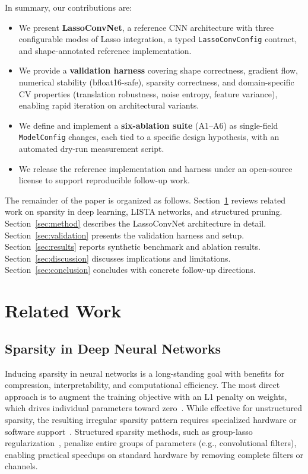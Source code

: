 \documentclass{article}
\begin{document}
In summary, our contributions are:
\begin{itemize}
    \item We present \textbf{LassoConvNet}, a reference CNN architecture with
          three configurable modes of Lasso integration, a typed
          \texttt{LassoConvConfig} contract, and shape-annotated reference
          implementation.
    \item We provide a \textbf{validation harness} covering shape correctness,
          gradient flow, numerical stability (bfloat16-safe), sparsity
          correctness, and domain-specific CV properties (translation robustness,
          noise entropy, feature variance), enabling rapid iteration on
          architectural variants.
    \item We define and implement a \textbf{six-ablation suite} (A1--A6) as
          single-field \texttt{ModelConfig} changes, each tied to a specific
          design hypothesis, with an automated dry-run measurement script.
    \item We release the reference implementation and harness under an open-source
          license to support reproducible follow-up work.
\end{itemize}

The remainder of the paper is organized as follows. Section~\ref{sec:related}
reviews related work on sparsity in deep learning, LISTA networks, and
structured pruning. Section~\ref{sec:method} describes the LassoConvNet
architecture in detail. Section~\ref{sec:validation} presents the validation
harness and setup. Section~\ref{sec:results} reports synthetic benchmark and
ablation results. Section~\ref{sec:discussion} discusses implications and
limitations. Section~\ref{sec:conclusion} concludes with concrete follow-up
directions.

\section{Related Work}
\label{sec:related}

\subsection{Sparsity in Deep Neural Networks}

Inducing sparsity in neural networks is a long-standing goal with benefits for
compression, interpretability, and computational efficiency. The most direct
approach is to augment the training objective with an L1 penalty on weights,
which drives individual parameters toward zero~\cite{han2015learning,
louizos2018learning}. While effective for unstructured sparsity, the resulting
irregular sparsity pattern requires specialized hardware or software
support~\cite{gale2019state}. Structured sparsity methods, such as group-lasso
regularization~\cite{yuan2006model, wen2016learning}, penalize entire groups of
parameters (e.g., convolutional filters), enabling practical speedups on standard
hardware by removing complete filters or channels.
\end{document}
